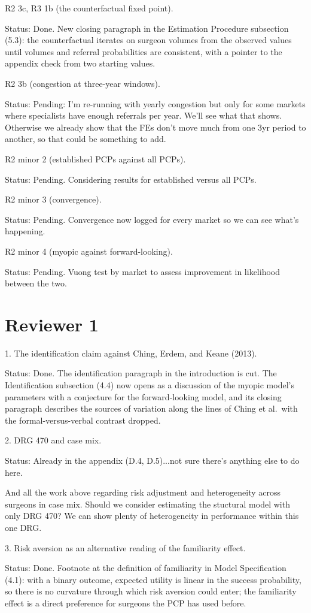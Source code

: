\documentclass[11pt]{article}
\newcommand{\status}[1]{\par\noindent Status: #1\par\medskip\noindent{\color{gray!40}\hrulefill}\par\medskip}
\begin{document}
R2 3c, R3 1b (the counterfactual fixed point). \status{Done. New closing paragraph in the Estimation Procedure subsection (5.3): the counterfactual iterates on surgeon volumes from the observed values until volumes and referral probabilities are consistent, with a pointer to the appendix check from two starting values.}

R2 3b (congestion at three-year windows). \status{Pending: I'm re-running with yearly congestion but only for some markets where specialists have enough referrals per year. We'll see what that shows. Otherwise we already show that the FEs don't move much from one 3yr period to another, so that could be something to add.}

R2 minor 2 (established PCPs against all PCPs). \status{Pending. Considering results for established versus all PCPs.}

R2 minor 3 (convergence). \status{Pending. Convergence now logged for every market so we can see what's happening.}

R2 minor 4 (myopic against forward-looking). \status{Pending. Vuong test by market to assess improvement in likelihood between the two.}

\section{Reviewer 1}

1. The identification claim against Ching, Erdem, and Keane (2013). \status{Done. The identification paragraph in the introduction is cut. The Identification subsection (4.4) now opens as a discussion of the myopic model's parameters with a conjecture for the forward-looking model, and its closing paragraph describes the sources of variation along the lines of Ching et al.\ with the formal-versus-verbal contrast dropped.}

2. DRG 470 and case mix. \status{Already in the appendix (D.4, D.5)...not sure there's anything else to do here.}

And all the work above regarding risk adjustment and heterogeneity across surgeons in case mix. Should we consider estimating the stuctural model with only DRG 470? We can show plenty of heterogeneity in performance within this one DRG.

3. Risk aversion as an alternative reading of the familiarity effect. \status{Done. Footnote at the definition of familiarity in Model Specification (4.1): with a binary outcome, expected utility is linear in the success probability, so there is no curvature through which risk aversion could enter; the familiarity effect is a direct preference for surgeons the PCP has used before.}
\end{document}
